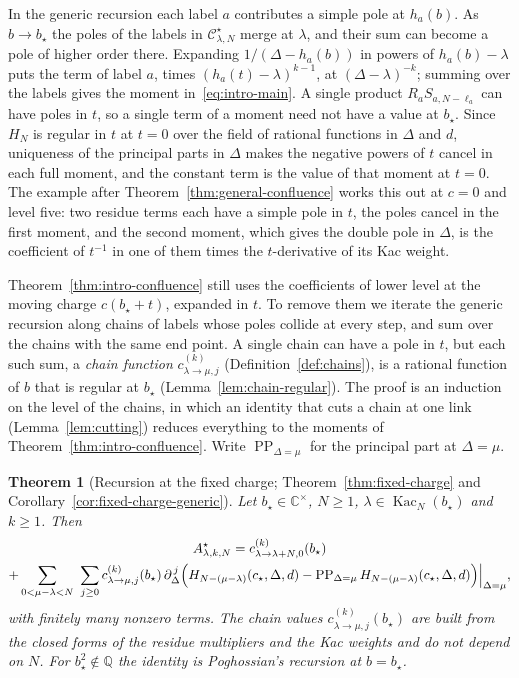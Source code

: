 \documentclass[twoside,10pt]{article}
\numberwithin{equation}{section}
\theoremstyle{slbody}
\newtheorem{introtheorem}{Theorem}
\theoremstyle{definition}
\theoremstyle{remark}
\newcommand{\PP}{\operatorname{PP}}
\begin{document}
In the generic recursion each label \(a\) contributes a simple pole at
\(h_a(b)\).  As \(b\to b_\star\) the poles of the labels in
\({\mathcal C}^\star_{\lambda,N}\) merge at \(\lambda\), and their sum can
become a pole of higher order there.  Expanding \(1/(\Delta-h_a(b))\) in
powers of \(h_a(b)-\lambda\) puts the term of label \(a\), times
\((h_a(t)-\lambda)^{k-1}\), at \((\Delta-\lambda)^{-k}\); summing over the
labels gives the moment in~\eqref{eq:intro-main}.  A single product
\(R_aS_{a,N-\ell_a}\) can have poles in \(t\), so a single term of a moment
need not have a value at \(b_\star\).  Since \(H_N\) is regular in \(t\) at
\(t=0\) over the field of rational functions in \(\Delta\) and \(d\),
uniqueness of the principal parts in \(\Delta\) makes the negative powers of
\(t\) cancel in each full moment, and the constant term is the value of that
moment at \(t=0\).  The example after
Theorem~\ref{thm:general-confluence} works this out at \(c=0\) and level
five: two residue terms each have a simple pole in \(t\), the poles cancel in
the first moment, and the second moment, which gives the double pole in
\(\Delta\), is the coefficient of \(t^{-1}\) in one of them times the
\(t\)-derivative of its Kac weight.

Theorem~\ref{thm:intro-confluence} still uses the coefficients of lower
level at the moving charge \(c(b_\star+t)\), expanded in \(t\).  To remove
them we iterate the generic recursion along chains of labels whose poles
collide at every step, and sum over the chains with the same end point.  A
single chain can have a pole in \(t\), but each such sum, a \emph{chain
function} \(c^{(k)}_{\lambda\to\mu,j}\) (Definition~\ref{def:chains}), is a
rational function of \(b\) that is regular at \(b_\star\)
(Lemma~\ref{lem:chain-regular}).  The proof is an induction on the level of
the chains, in which an identity that cuts a chain at one link
(Lemma~\ref{lem:cutting}) reduces everything to the moments of
Theorem~\ref{thm:intro-confluence}.  Write \(\PP_{\Delta=\mu}\) for the
principal part at \(\Delta=\mu\).

\begin{introtheorem}[Recursion at the fixed charge;
Theorem~\ref{thm:fixed-charge} and Corollary~\ref{cor:fixed-charge-generic}]
\label{thm:intro-fixed-charge}
Let \(b_\star\in\mathbb C^\times\), \(N\geq1\),
\(\lambda\in\operatorname{Kac}_N(b_\star)\) and \(k\geq1\).  Then
\begin{multline*}
 A^\star_{\lambda,k,N}=c^{(k)}_{\lambda\to\lambda+N,0}(b_\star)\\
 +\sum_{0<\mu-\lambda<N}\ \sum_{j\geq0}c^{(k)}_{\lambda\to\mu,j}(b_\star)\,
 \partial_\Delta^{\,j}\Bigl(H_{N-(\mu-\lambda)}(c_\star,\Delta,d)
 -\PP_{\Delta=\mu}H_{N-(\mu-\lambda)}(c_\star,\Delta,d)\Bigr)\Big|_{\Delta=\mu},
\end{multline*}
with finitely many nonzero terms.  The chain values
\(c^{(k)}_{\lambda\to\mu,j}(b_\star)\) are built from the closed forms of the
residue multipliers and the Kac weights and do not depend on \(N\).  For
\(b_\star^2\notin\mathbb Q\) the identity is Poghossian's recursion at
\(b=b_\star\).
\end{introtheorem}
\end{document}

